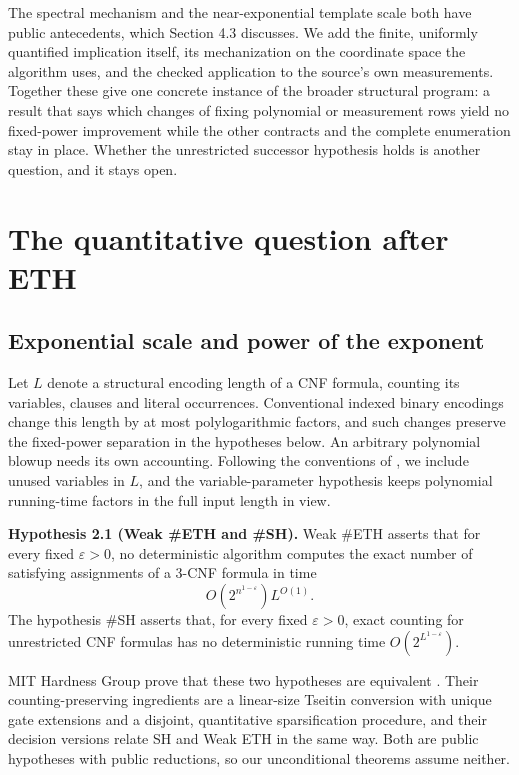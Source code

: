 \documentclass[11pt,letterpaper]{article}
\begin{document}
The spectral mechanism and the near-exponential template scale both have
public antecedents, which Section 4.3 discusses. We add the finite,
uniformly quantified implication itself, its mechanization on the
coordinate space the algorithm uses, and the checked application to the
source's own measurements. Together these give one concrete instance of
the broader structural program: a result that says which changes of
fixing polynomial or measurement rows yield no fixed-power improvement
while the other contracts and the complete enumeration stay in place.
Whether the unrestricted successor hypothesis holds is another question,
and it stays open.

\section{The quantitative question after
ETH}\label{the-quantitative-question-after-eth}

\subsection{Exponential scale and power of the
exponent}\label{exponential-scale-and-power-of-the-exponent}

Let \(L\) denote a structural encoding length of a CNF formula, counting
its variables, clauses and literal occurrences. Conventional indexed
binary encodings change this length by at most polylogarithmic factors,
and such changes preserve the fixed-power separation in the hypotheses
below. An arbitrary polynomial blowup needs its own accounting.
Following the conventions of \citep{SH26}, we include unused variables
in \(L\), and the variable-parameter hypothesis keeps polynomial
running-time factors in the full input length in view.

\textbf{Hypothesis 2.1 (Weak \#ETH and \#SH).} Weak \#ETH asserts that
for every fixed \(\varepsilon>0\), no deterministic algorithm computes
the exact number of satisfying assignments of a 3-CNF formula in time
\[O\!\left(2^{n^{1-\varepsilon}}\right)L^{O(1)}.\] The hypothesis \#SH
asserts that, for every fixed \(\varepsilon>0\), exact counting for
unrestricted CNF formulas has no deterministic running time
\(O(2^{L^{1-\varepsilon}})\).

MIT Hardness Group prove that these two hypotheses are equivalent
\citep[Theorem 2.4]{SH26}. Their counting-preserving ingredients are a
linear-size Tseitin conversion with unique gate extensions and a
disjoint, quantitative sparsification procedure, and their decision
versions relate SH and Weak ETH in the same way. Both are public
hypotheses with public reductions, so our unconditional theorems assume
neither.
\end{document}
